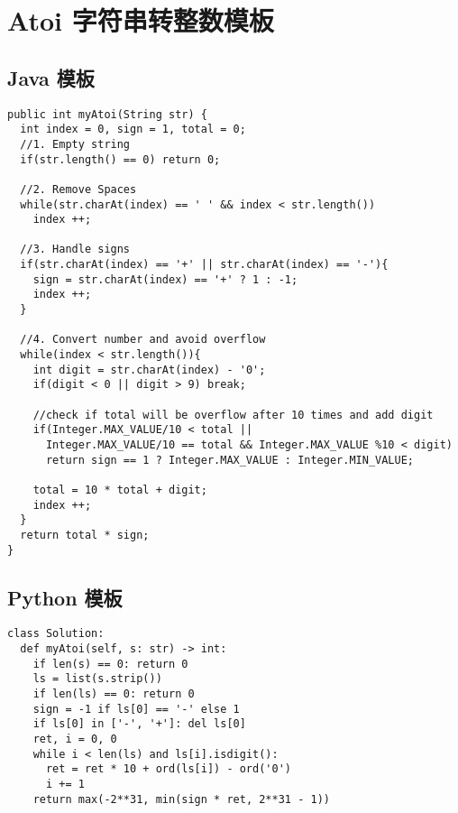 \newpage
\section{Atoi 字符串转整数模板}

\subsection{Java 模板}

\begin{verbatim}
public int myAtoi(String str) {
  int index = 0, sign = 1, total = 0;
  //1. Empty string
  if(str.length() == 0) return 0;

  //2. Remove Spaces
  while(str.charAt(index) == ' ' && index < str.length())
    index ++;

  //3. Handle signs
  if(str.charAt(index) == '+' || str.charAt(index) == '-'){
    sign = str.charAt(index) == '+' ? 1 : -1;
    index ++;
  }

  //4. Convert number and avoid overflow
  while(index < str.length()){
    int digit = str.charAt(index) - '0';
    if(digit < 0 || digit > 9) break;

    //check if total will be overflow after 10 times and add digit
    if(Integer.MAX_VALUE/10 < total ||
      Integer.MAX_VALUE/10 == total && Integer.MAX_VALUE %10 < digit)
      return sign == 1 ? Integer.MAX_VALUE : Integer.MIN_VALUE;

    total = 10 * total + digit;
    index ++;
  }
  return total * sign;
}
\end{verbatim}

\subsection{Python 模板}

\begin{verbatim}
class Solution:
  def myAtoi(self, s: str) -> int:
    if len(s) == 0: return 0
    ls = list(s.strip())
    if len(ls) == 0: return 0
    sign = -1 if ls[0] == '-' else 1
    if ls[0] in ['-', '+']: del ls[0]
    ret, i = 0, 0
    while i < len(ls) and ls[i].isdigit():
      ret = ret * 10 + ord(ls[i]) - ord('0')
      i += 1
    return max(-2**31, min(sign * ret, 2**31 - 1))
\end{verbatim}
